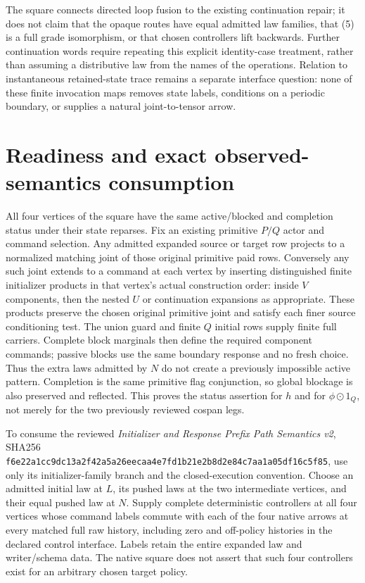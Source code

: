 \documentclass[11pt]{article}\usepackage{amsmath,amssymb,amsthm,geometry}\geometry{margin=1in}\newtheorem{theorem}{Theorem}
\begin{document}
The square connects directed loop fusion to the existing continuation repair; it does not claim that the opaque routes have equal admitted law families, that (5) is a full grade isomorphism, or that chosen controllers lift backwards. Further continuation words require repeating this explicit identity-case treatment, rather than assuming a distributive law from the names of the operations. Relation to instantaneous retained-state trace remains a separate interface question: none of these finite invocation maps removes state labels, conditions on a periodic boundary, or supplies a natural joint-to-tensor arrow.

\section{Readiness and exact observed-semantics consumption}
All four vertices of the square have the same active/blocked and completion status under their state reparses. Fix an existing primitive $P/Q$ actor and command selection. Any admitted expanded source or target row projects to a normalized matching joint of those original primitive paid rows. Conversely any such joint extends to a command at each vertex by inserting distinguished finite initializer products in that vertex's actual construction order: inside $V$ components, then the nested $U$ or continuation expansions as appropriate. These products preserve the chosen original primitive joint and satisfy each finer source conditioning test. The union guard and finite $Q$ initial rows supply finite full carriers. Complete block marginals then define the required component commands; passive blocks use the same boundary response and no fresh choice. Thus the extra laws admitted by $N$ do not create a previously impossible active pattern. Completion is the same primitive flag conjunction, so global blockage is also preserved and reflected. This proves the status assertion for $h$ and for $\phi\odot1_Q$, not merely for the two previously reviewed cospan legs.

To consume the reviewed \emph{Initializer and Response Prefix Path Semantics v2}, SHA256
\texttt{f6e22a1cc9dc13a2f42a5a26eecaa4e7fd1b21e2b8d2e84c7aa1a05df16c5f85}, use only its initializer-family branch and the closed-execution convention. Choose an admitted initial law at $L$, its pushed laws at the two intermediate vertices, and their equal pushed law at $N$. Supply complete deterministic controllers at all four vertices whose command labels commute with each of the four native arrows at every matched full raw history, including zero and off-policy histories in the declared control interface. Labels retain the entire expanded law and writer/schema data. The native square does not assert that such four controllers exist for an arbitrary chosen target policy.
\end{document}
